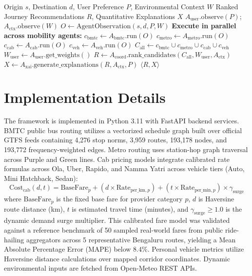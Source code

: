 \documentclass[runningheads]{llncs}
\begin{document}
\begin{algorithm}[h]
\caption{Coordinated Multi-Agent Journey Recommendation}
\label{alg:mas}
\begin{algorithmic}[1]
\REQUIRE Origin $s$, Destination $d$, User Preference $P$, Environmental Context $W$
\ENSURE Ranked Journey Recommendations $R$, Quantitative Explanations $X$
\STATE $A_{\text{user}}.\text{observe}(P)$; $A_{\text{ctx}}.\text{observe}(W)$
\STATE $O \leftarrow \text{AgentObservation}(s, d, P, W)$
\STATE \textbf{Execute in parallel across mobility agents:}
\STATE \quad $c_{\text{bmtc}} \leftarrow A_{\text{bmtc}}.\text{run}(O)$
\STATE \quad $c_{\text{metro}} \leftarrow A_{\text{metro}}.\text{run}(O)$
\STATE \quad $c_{\text{cab}} \leftarrow A_{\text{cab}}.\text{run}(O)$
\STATE \quad $c_{\text{veh}} \leftarrow A_{\text{veh}}.\text{run}(O)$
\STATE $C_{\text{all}} \leftarrow c_{\text{bmtc}} \cup c_{\text{metro}} \cup c_{\text{cab}} \cup c_{\text{veh}}$
\STATE $W_{\text{user}} \leftarrow A_{\text{user}}.\text{get\_weights}()$
\STATE $R \leftarrow A_{\text{coord}}.\text{rank\_candidates}(C_{\text{all}}, W_{\text{user}}, A_{\text{ctx}})$
\STATE $X \leftarrow A_{\text{xai}}.\text{generate\_explanations}(R, A_{\text{ctx}}, P)$
\RETURN $\langle R, X \rangle$
\end{algorithmic}
\end{algorithm}


\section{Implementation Details}
\label{sec:implementation}

The framework is implemented in Python 3.11 with FastAPI backend services. BMTC public bus routing utilizes a vectorized schedule graph built over official GTFS feeds containing 4,276 stop norms, 3,959 routes, 193,178 nodes, and 193,772 frequency-weighted edges. Metro routing uses station-hop graph traversal across Purple and Green lines. Cab pricing models integrate calibrated rate formulas across Ola, Uber, Rapido, and Namma Yatri across vehicle tiers (Auto, Mini Hatchback, Sedan):
\begin{equation}
\text{Cost}_{\text{cab}}(d, t) = \text{BaseFare}_p + \left(d \times \text{Rate}_{\text{per\_km}, p}\right) + \left(t \times \text{Rate}_{\text{per\_min}, p}\right) \times \gamma_{\text{surge}}
\end{equation}
where $\text{BaseFare}_p$ is the fixed base fare for provider category $p$, $d$ is Haversine route distance (km), $t$ is estimated travel time (minutes), and $\gamma_{\text{surge}} \ge 1.0$ is the dynamic demand surge multiplier. This calibrated fare model was validated against a reference benchmark of 50 sampled real-world fares from public ride-hailing aggregators across 5 representative Bengaluru routes, yielding a Mean Absolute Percentage Error (MAPE) below $8.4\%$. Personal vehicle metrics utilize Haversine distance calculations over mapped corridor coordinates. Dynamic environmental inputs are fetched from Open-Meteo REST APIs.
\end{document}
